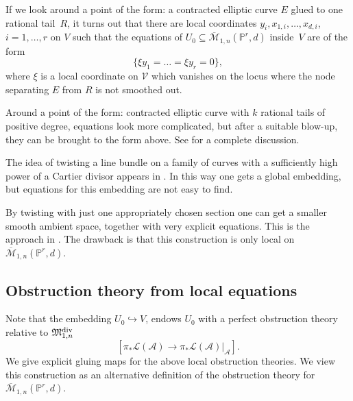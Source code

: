 \documentclass[pdftex]{sigma}
\numberwithin{equation}{section}
\newcommand{\MM}[4]{\overline{\mathcal M}_{#1,#2}(#3,#4)}
\begin{document}
If we look around a point of the form: a contracted elliptic curve $E$ glued to one rational tail~$R$, it turns out that there are local coordinates $y_i,x_{1,i},\ldots,x_{d,i}$, $i=1,\ldots,r$ on $V$ such that the equations of $U_0\subseteq \MM{1}{n}{\mathbb P^r}{d}$ inside~$V$ are of the form
\begin{equation}\label{genoneeq}
\{\xi y_1=\dots = \xi y_r=0\},
\end{equation}
where $\xi$ is a local coordinate on $\mathcal V$ which vanishes on the locus where the node separating $E$ from $R$ is not smoothed out.

Around a point of the form: contracted elliptic curve with $k$ rational tails of positive degree, equations look more complicated, but after a suitable blow-up, they can be brought to the form above. See \cite{HL} for a complete discussion.
\begin{Remark}The idea of twisting a line bundle on a family of curves with a sufficiently high power of a Cartier divisor appears in \cite{CF-K,CF-K-M}. In this way one gets a global embedding, but equations for this embedding are not easy to find.

By twisting with just one appropriately chosen section one can get a smaller smooth ambient space, together with very explicit equations. This is the approach in \cite[Theorem~4.16]{HL}. The drawback is that this construction is only local on $\MM{1}{n}{\mathbb P^r}{d}$.
\end{Remark}

\subsection{Obstruction theory from local equations} \label{obs:loceq}
Note that the embedding $U_0\hookrightarrow V$, endows $U_0$ with a perfect obstruction theory relative to $\mathfrak{M}^{\rm div}_{1,n}$
\[[\pi_*\mathcal L(\mathcal A)\to \pi_*\mathcal L(\mathcal A)|_{\mathcal A}].\]
We give explicit gluing maps for the above local obstruction theories. We view this construction as an alternative definition of the obstruction theory for $\MM{1}{n}{\mathbb P^r}{d}$.
\end{document}
